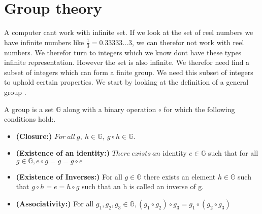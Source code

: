 
\section{Group theory}
A computer cant work with infinite set. If we look at the set of reel numbers we have infinite numbers like $\frac{1}{3} = 0.33333...3$, we can therefor not work with reel numbers. We therefor turn to integers which we know dont have these types infinite representation. However the set is also infinite. We therefor need find a subset of integers which can form a finite group. We need this subset of integers to uphold certain properties. We start by looking at the definition of a general group \cite{Paar}.  

\begin{defi}
A \textnormal{group} is a set \begin{math}\mathbb{G}\end{math} along with a binary operation \begin{math}\circ \end{math} for which the following conditions hold:.
\begin{itemize}
\item \textnormal{\textbf{(Closure:)}}  \begin{math} For \ all \ g, \ h \in \mathbb{G},\ g \circ h \in \mathbb{G} \end{math}.
\item \textnormal{\textbf{(Existence of an identity:)}} \begin{math} There \ exists \ an \end{math} \textnormal{identity} \begin{math} e \in \mathbb{G} \end{math} such that for  all \begin{math} g \in \mathbb{G}, e \circ g = g =g \circ e \end{math}
\item \textnormal{\textbf{(Existence of Inverses:)}} For all \begin{math}g \in \mathbb{G}\end{math} there exists an element \begin{math}h \in \mathbb{G}\end{math} such that \begin{math}g \circ h = e =h \circ g \end{math} such that an h is called an \textnormal{inverse} of g.
\item \textnormal{\textbf{(Associativity:)}} For all \begin{math}g_1, g_2, g_3 \in \mathbb{G}, (g_1 \circ g_2) \circ g_3 = g_1 \circ( g_2 \circ g_3) \end{math}

\end{itemize}
\end{defi}
